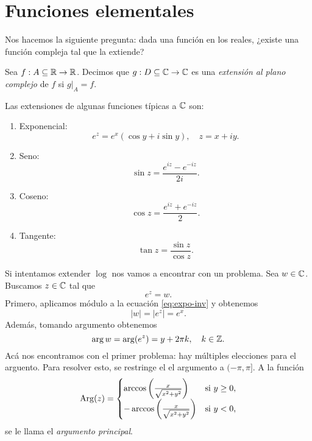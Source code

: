 \section{Funciones elementales}

Nos hacemos la siguiente pregunta: dada una función en los reales, ¿existe una función compleja tal que la extiende?

\begin{definition}
    Sea $f : A \subseteq \mathbb{R} \to \mathbb{R}$. Decimos que $g: D \subseteq \mathbb{C} \to \mathbb{C}$ es una \emph{extensión al plano complejo} de $f$ si $g|_A = f$.
\end{definition}

Las extensiones de algunas funciones típicas a $\mathbb{C}$ son:
\begin{enumerate}
    \item Exponencial:
    \begin{equation*}
        e^z = e^x(\cos y + i \sin y), \quad z = x + i y.
    \end{equation*}
    \item Seno:
    \begin{equation*}
        \sin z = \frac{e^{iz} - e^{-iz}}{2i}.
    \end{equation*}
    \item Coseno:
    \begin{equation*}
        \cos z = \frac{e^{iz} + e^{-iz}}{2}.
    \end{equation*}
    \item Tangente:
    \begin{equation*}
        \tan z = \frac{\sin z}{\cos z}.
    \end{equation*}
\end{enumerate}

Si intentamos extender $\log$ nos vamos a encontrar con un problema. Sea $w \in \mathbb{C}$. Buscamos $z \in \mathbb{C}$ tal que 
\begin{equation}
    \label{eq:expo-inv}
    e^z = w.
\end{equation}
Primero, aplicamos módulo a la ecuación \ref{eq:expo-inv} y obtenemos
\begin{equation*}
    |w| = |e^z| = e^x.
\end{equation*}
Además, tomando argumento obtenemos
\begin{equation*}
    \arg w = \arg(e^z) = y + 2 \pi k, \quad k \in \mathbb{Z}.
\end{equation*}
Acá nos encontramos con el primer problema: hay múltiples elecciones para el arguento. Para resolver esto, se restringe el el argumento a $( -\pi, \pi]$. A la función
\begin{equation*}
    \operatorname{Arg}(z) = \begin{cases}
        \arccos \left(\frac{x}{\sqrt{x^2 + y^2}}\right) & \text{si } y \geq 0, \\
        -\arccos \left(\frac{x}{\sqrt{x^2 + y^2}}\right) & \text{si } y < 0,
    \end{cases}
\end{equation*}
se le llama el \textit{argumento principal}. 

